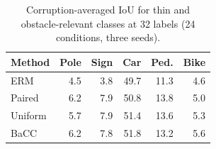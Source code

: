 \begin{table}[t]
\centering
\caption{Corruption-averaged IoU for thin and obstacle-relevant classes at 32 labels (24 conditions, three seeds).}
\label{tab:obstacle-classes}
\small
\begin{tabular}{lrrrrr}
\toprule Method & Pole & Sign & Car & Ped. & Bike \\
\midrule
ERM & 4.5 & 3.8 & 49.7 & 11.3 & 4.6 \\
Paired & 6.2 & 7.9 & 50.8 & 13.8 & 5.0 \\
Uniform & 5.7 & 7.9 & 51.4 & 13.6 & 5.3 \\
BaCC & 6.2 & 7.8 & 51.8 & 13.2 & 5.6 \\
\bottomrule
\end{tabular}
\end{table}
